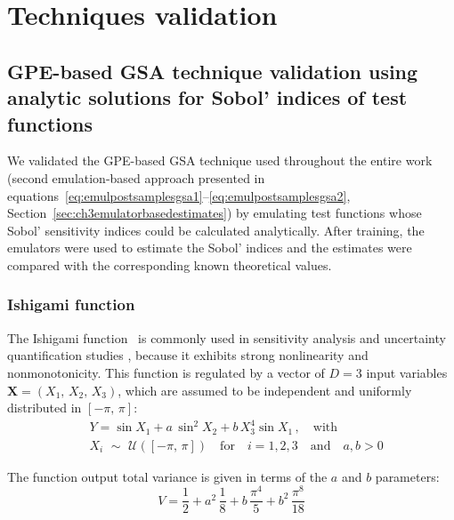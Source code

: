 \chapter{Techniques validation}\label{cha:chapterA}

%
%
%
\section{GPE-based GSA technique validation using analytic solutions for Sobol' indices of test functions}\label{chA:GPE-based_GSA_technique_validation_using_analytic_solutions_for_Sobol'_indices_of_test_functions}
We validated the GPE-based GSA technique used throughout the entire work (second emulation-based approach presented in equations~\eqref{eq:emulpostsamplesgsa1}--\eqref{eq:emulpostsamplesgsa2}, Section~\ref{sec:ch3emulatorbasedestimates}) by emulating test functions whose Sobol' sensitivity indices could be calculated analytically. After training, the emulators were used to estimate the Sobol' indices and the estimates were compared with the corresponding known theoretical values.

%
%
%
\subsection{Ishigami function}
The Ishigami function~\cite{Ishigami:1990} is commonly used in sensitivity analysis and uncertainty quantification studies , because it exhibits strong nonlinearity and nonmonotonicity. This function is regulated by a vector of $D=3$ input variables $\mathbf{X}=(X_1,\,X_2,\,X_3)$, which are assumed to be independent and uniformly distributed in $[-\pi,\,\pi]$:
%
\begin{align}\label{eq:ishigamifun}
	& Y = \sin{X_1} + a\,\sin^2{X_2} + b\,X_3^4\sin{X_1}\,,\quad\text{with} \\
	& X_i\,\,\sim\,\,\mathcal{U}([-\pi,\,\pi])\quad \text{for}\quad i=1,2,3\quad \text{and}\quad a,b>0
\end{align}

\vspace{0.2cm}\noindent
The function output total variance is given in terms of the $a$ and $b$ parameters:
%
\begin{equation}\label{eq:ifun_total_var}
	V = \frac{1}{2} + a^2\,\frac{1}{8} + b\,\frac{\pi^4}{5} + b^2\,\frac{\pi^8}{18}
\end{equation}


